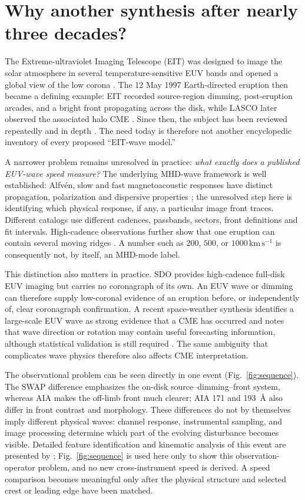 \documentclass[11pt]{article}
\let\parencite\citep
\let\textcite\citet
\newcommand{\kms}{\mathrm{km\,s^{-1}}}
\begin{document}
\section{Why another synthesis after nearly three decades?}
The Extreme-ultraviolet Imaging Telescope (EIT) was designed to image the solar atmosphere in several temperature-sensitive EUV bands and opened a global view of the low corona \parencite{Delaboudiniere1995}. The 12 May 1997 Earth-directed eruption then became a defining example: EIT recorded source-region dimming, post-eruption arcades, and a bright front propagating across the disk, while LASCO later observed the associated halo CME \parencite{Thompson1998}. Since then, the subject has been reviewed repeatedly and in depth \parencite{ZhukovAuchere2004,PatsourakosVourlidas2012,LiuOfman2014,Warmuth2015,Long2017}. The need today is therefore not another encyclopedic inventory of every proposed ``EIT-wave model.''

A narrower problem remains unresolved in practice: \emph{what exactly does a published EUV-wave speed measure?} The underlying MHD-wave framework is well established: Alfv\'en, slow and fast magnetoacoustic responses have distinct propagation, polarization and dispersive properties \parencite{NakariakovVerwichte2005}; the unresolved step here is identifying which physical response, if any, a particular image front traces. Different catalogs use different cadences, passbands, sectors, front definitions and fit intervals. High-cadence observations further show that one eruption can contain several moving ridges \parencite{Liu2010,Liu2012}. A number such as $200$, $500$, or $1000\,\kms$ is consequently not, by itself, an MHD-mode label.

This distinction also matters in practice. SDO provides high-cadence full-disk EUV imaging but carries no coronagraph of its own. An EUV wave or dimming can therefore supply low-coronal evidence of an eruption before, or independently of, clear coronagraph confirmation. A recent space-weather synthesis identifies a large-scale EUV wave as strong evidence that a CME has occurred and notes that wave direction or rotation may contain useful forecasting information, although statistical validation is still required \parencite{Green2026}. The same ambiguity that complicates wave physics therefore also affects CME interpretation.

The observational problem can be seen directly in one event (Fig.~\ref{fig:sequence}). The SWAP difference emphasizes the on-disk source--dimming--front system, whereas AIA makes the off-limb front much clearer; AIA 171 and 193~\AA{} also differ in front contrast and morphology. These differences do not by themselves imply different physical waves: channel response, instrumental sampling, and image processing determine which part of the evolving disturbance becomes visible. Detailed feature identification and kinematic analysis of this event are presented by \textcite{OHara2019}; Fig.~\ref{fig:sequence} is used here only to show this observation-operator problem, and no new cross-instrument speed is derived. A speed comparison becomes meaningful only after the physical structure and selected crest or leading edge have been matched.
\end{document}
